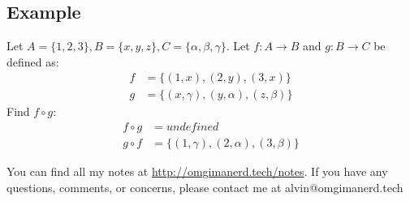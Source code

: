 \documentclass[letterpaper, 12pt]{math}
\begin{document}
\subsection*{Example}
Let \( A = \{1,2,3\}, B = \{x,y,z\}, C = \{\alpha,\beta,\gamma\} \). Let
\( f:A\to B \) and \( g:B\to C \) be defined as:
\begin{align*}
  f &= \{(1,x),(2,y),(3,x)\} \\
  g &= \{(x,\gamma),(y,\alpha),(z,\beta)\}
\end{align*}
Find \( f\circ g \):
\begin{align*}
  f\circ g &= undefined \\
  g\circ f &= \{(1,\gamma),(2,\alpha),(3,\beta)\}
\end{align*}

\begin{center}
  You can find all my notes at \url{http://omgimanerd.tech/notes}. If you have
  any questions, comments, or concerns, please contact me at
  alvin@omgimanerd.tech
\end{center}
\end{document}
